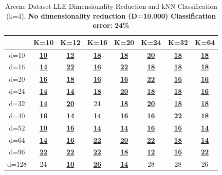 \begin{table}[H]
\centering
\label{tab:table19}
\begin{tabular}{|c|c|c|c|c|c|c|c|}
\hline
 & K=10 & K=12 & K=16 & K=20 & K=24 & K=32 & K=64 \\
\hline
\textlatin{d}=10 & \underline{\textbf{10}} & \underline{\textbf{12}} & \underline{\textbf{18}} & \underline{\textbf{18}} & \underline{\textbf{20}} & \underline{\textbf{18}} & \underline{\textbf{18}} \\
\textlatin{d}=16 & \underline{\textbf{14}} & \underline{\textbf{22}} & \underline{\textbf{16}} & \underline{\textbf{22}} & \underline{\textbf{18}} & \underline{\textbf{18}} & \underline{\textbf{18}} \\
\textlatin{d=20} & \underline{\textbf{16}} & \underline{\textbf{18}} & \underline{\textbf{16}} & \underline{\textbf{16}} & \underline{\textbf{22}} & \underline{\textbf{16}} & \underline{\textbf{16}} \\
\textlatin{d}=24 & \underline{\textbf{14}} & \underline{\textbf{14}} & \underline{\textbf{18}} & \underline{\textbf{20}} & \underline{\textbf{18}} & \underline{\textbf{18}} & \underline{\textbf{16}} \\
\textlatin{d}=32 & \underline{\textbf{14}} & \underline{\textbf{20}} & 24 & \underline{\textbf{18}} & \underline{\textbf{20}} & \underline{\textbf{18}} & \underline{\textbf{18}} \\
\textlatin{d}=40 & \underline{\textbf{16}} & \underline{\textbf{14}} & \underline{\textbf{14}} & \underline{\textbf{16}} & \underline{\textbf{16}} & \underline{\textbf{22}} & \underline{\textbf{18}} \\
\textlatin{d}=52 & \underline{\textbf{10}} & \underline{\textbf{16}} & \underline{\textbf{14}} & \underline{\textbf{14}} & \underline{\textbf{16}} & \underline{\textbf{16}} & \underline{\textbf{14}} \\
\textlatin{d}=64 & \underline{\textbf{14}} & \underline{\textbf{16}} & \underline{\textbf{22}} & \underline{\textbf{20}} & \underline{\textbf{22}} & \underline{\textbf{18}} & \underline{\textbf{14}} \\
\textlatin{d}=96 & \underline{\textbf{22}} & \underline{\textbf{22}} & \underline{\textbf{22}} & \underline{\textbf{18}} & \underline{\textbf{12}} & \underline{\textbf{16}} & \underline{\textbf{22}} \\
\textlatin{d}=128 & 24 & \underline{\textbf{10}} & \underline{\textbf{26}} & \underline{\textbf{14}} & 28 & 28 & 26 \\
\hline
\end{tabular}
\caption{\textlatin{Arcene Dataset LLE Dimensionality Reduction and kNN Classification (k=4). \textbf{No dimensionality reduction (D=10.000) Classification error: 24\%}}}
\end{table}

